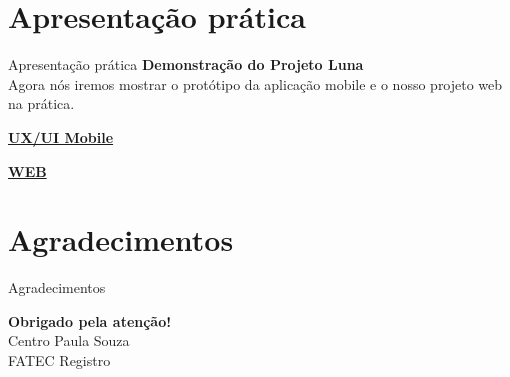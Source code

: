 \documentclass{beamer}
\begin{document}

\section{Apresentação prática}
\begin{frame}{Apresentação prática}
    \centering
    {\Large\textbf{\textcolor{cpsred}{Demonstração do Projeto Luna}}}\\[0.5cm]
    
   \centering
   {\small  Agora nós iremos mostrar o protótipo da aplicação mobile e o nosso projeto web na prática.}\\[0.5cm]
    
    \vspace{0.2cm}
    
    \begin{center}
        \begin{tcolorbox}[
            enhanced,
            colback=white,
            colframe=cpsred,
            arc=4mm,
            boxrule=1.5pt,
            shadow={2mm}{-1mm}{0mm}{cpsgray!50},
            width=0.8\linewidth,
            center,
            before skip=0.5cm,
            after skip=0.5cm
        ]
        \centering
        \large
        \href{https://www.figma.com/design/HB50qhAAMrpEkTEfcGznwZ/Projeto-Integrador?node-id=18-4&t=4vMySIzPoZhpcH7C-1}{\textbf{UX/UI Mobile}}
        \end{tcolorbox}
        
        \begin{tcolorbox}[
            enhanced,
            colback=white,
            colframe=cpsred,
            arc=4mm,
            boxrule=1.5pt,
            shadow={2mm}{-1mm}{0mm}{cpsgray!50},
            width=0.8\linewidth,
            center,
            before skip=0.5cm,
            after skip=0.5cm
        ]
        \centering
        \large
        \href{http://localhost:8080/}{\textbf{WEB}}
        \end{tcolorbox}
    \end{center}
\end{frame}


\section{Agradecimentos}
\begin{frame}{Agradecimentos}
\centering
    \vspace{1cm}
    
    {\color{cpsred}\Huge\textbf{Obrigado pela atenção!}}\\[1.5cm]
    \textcolor{cpsgray}{\large Centro Paula Souza}\\[0.2cm]
    \textcolor{cpsgray}{\large FATEC Registro}
\end{frame}
\end{document}
